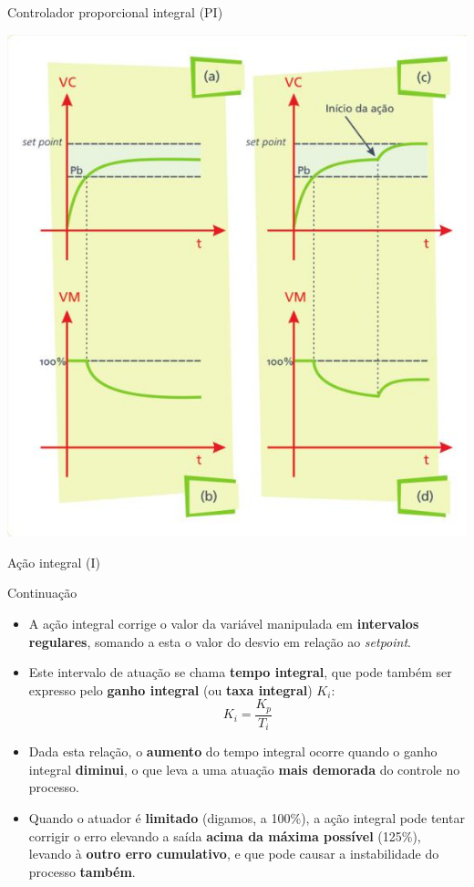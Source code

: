 \begin{frame}{Controlador proporcional integral (PI)}
	
	\centering
	\includegraphics[height=0.9\textheight]{Figuras/Ch12/fig5}
	
\end{frame}


\begin{frame}{Ação integral (I)}
	\begin{block}{Continuação}
		\begin{itemize}
			\item A ação integral corrige o valor da variável manipulada em \textbf{intervalos regulares}, somando a esta o valor do desvio em relação ao \textit{setpoint}.
			\item Este intervalo de atuação se chama \textbf{tempo integral}, que pode também ser expresso pelo \textbf{ganho integral} (ou \textbf{taxa integral}) $ K_i $:
			\[ K_i=\dfrac{K_p}{T_i} \]
			\item Dada esta relação, o \textbf{aumento} do tempo integral ocorre quando o ganho integral \textbf{diminui}, o que leva a uma atuação \textbf{mais demorada} do controle no processo.
			\item Quando o atuador é \textbf{limitado} (digamos, a 100\%), a ação integral pode tentar corrigir o erro elevando a saída \textbf{acima da máxima possível} (125\%), levando à \textbf{outro erro cumulativo}, e que pode causar a instabilidade do processo \textbf{também}.
		\end{itemize}
	\end{block}
\end{frame}


